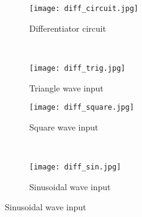 \documentclass{article}
\begin{document}
\begin{CJK*}{UTF8}{bkai}
\begin{figure}[h]
\begin{center}
        \begin{subfigure}[b]{0.2\textwidth}
            \texttt{[image: diff\_circuit.jpg]}
            \caption{Differentiator circuit}
        \end{subfigure}
        ~
        \begin{subfigure}[b]{0.3\textwidth}
            \texttt{[image: diff\_trig.jpg]}
            \caption{Triangle wave input}
        \end{subfigure}
    
        \begin{subfigure}[b]{0.3\textwidth}
            \texttt{[image: diff\_square.jpg]}
            \caption{Square wave input}
        \end{subfigure}
        ~
        \begin{subfigure}[b]{0.3\textwidth}
            \texttt{[image: diff\_sin.jpg]}
            \caption{Sinusoidal wave input}
        \end{subfigure}
    \end{center}   
    \end{figure}
    

\end{CJK*}
\end{document}

